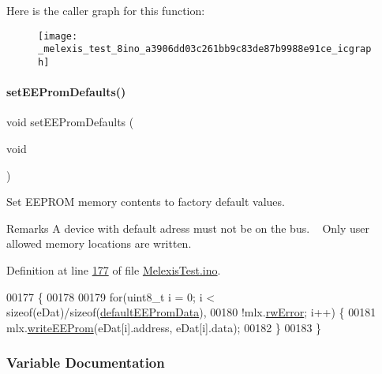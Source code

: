Here is the caller graph for this function\+:\nopagebreak
\begin{figure}[H]
\begin{center}
\leavevmode
\texttt{[image: \_melexis\_test\_8ino\_a3906dd03c261bb9c83de87b9988e91ce\_icgraph]}
\end{center}
\end{figure}
\mbox{\label{_melexis_test_8ino_a5662aecfa23cb7ad365b8246e928c843}} 
\paragraph{\texorpdfstring{set\+E\+E\+Prom\+Defaults()}{setEEPromDefaults()}}
{\footnotesize\ttfamily void set\+E\+E\+Prom\+Defaults (\begin{DoxyParamCaption}\item[{void}]{ }\end{DoxyParamCaption})}



Set E\+E\+P\+R\+OM memory contents to factory default values. 

\begin{DoxyRemark}{Remarks}
A device with default adress must not be on the bus. ~\newline
{\ttfamily Only user allowed memory locations are written.} 
\end{DoxyRemark}


Definition at line \mbox{\hyperlink{_melexis_test_8ino_source_l00177}{177}} of file \mbox{\hyperlink{_melexis_test_8ino_source}{Melexis\+Test.\+ino}}.


\begin{DoxyCode}
00177                              \{
00178 
00179     \textcolor{keywordflow}{for}(uint8\_t i = 0; i < \textcolor{keyword}{sizeof}(eDat)/\textcolor{keyword}{sizeof}(\mbox{\hyperlink{structdefault_e_e_prom_data}{defaultEEPromData}}),
00180         !mlx.\mbox{\hyperlink{class_m_l_x90614_a13d10b57b4369c27e740585bf3907b0e}{rwError}}; i++) \{ 
00181         mlx.\mbox{\hyperlink{class_m_l_x90614_a70b3e428c623b6af5bedf199f5c16490}{writeEEProm}}(eDat[i].address, eDat[i].data);
00182     \}
00183 \}
\end{DoxyCode}


\subsubsection{Variable Documentation}
\mbox{\label{_melexis_test_8ino_aa749b7d2a476c21158b27ed53cdcbc49}} 
